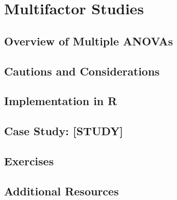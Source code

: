 
\chapter{Multifactor Studies}

\section{Overview of Multiple ANOVAs}

\section{Cautions and Considerations}

\section{Implementation in R}

\section{Case Study: [STUDY]}

\section{Exercises}

\section{Additional Resources}
